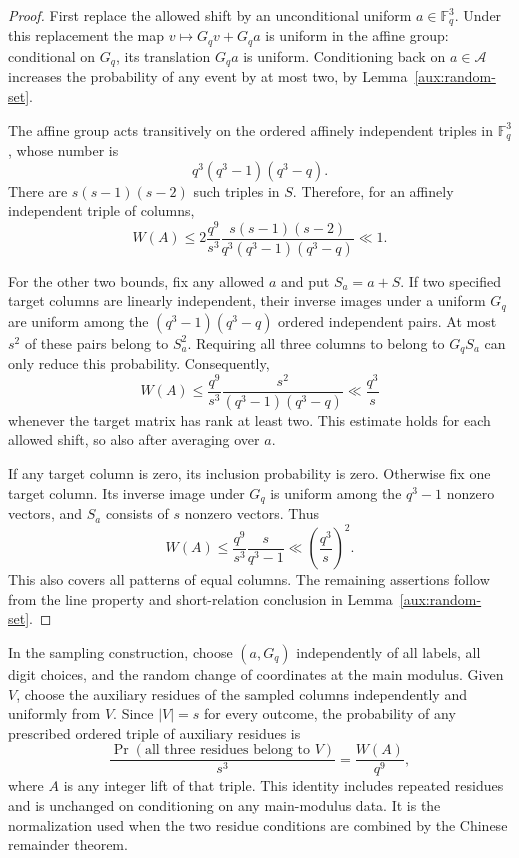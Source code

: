 \begin{proof}
First replace the allowed shift by an unconditional uniform
$a\in\mathbb F_q^3$.  Under this replacement the map
$v\mapsto G_qv+G_qa$ is uniform in the affine group: conditional on
$G_q$, its translation $G_qa$ is uniform.  Conditioning back on
$a\in\mathcal A$ increases the probability of any event by at most
two, by Lemma~\ref{aux:random-set}.

The affine group acts transitively on the ordered affinely independent
triples in $\mathbb F_q^3$, whose number is
\[
 q^3(q^3-1)(q^3-q).
\]
There are $s(s-1)(s-2)$ such triples in $S$.  Therefore, for an
affinely independent triple of columns,
\[
 W(A)\le
 2\frac{q^9}{s^3}
 \frac{s(s-1)(s-2)}{q^3(q^3-1)(q^3-q)}\ll1.
\]

For the other two bounds, fix any allowed $a$ and put $S_a=a+S$.
If two specified target columns are linearly independent, their
inverse images under a uniform $G_q$ are uniform among the
$(q^3-1)(q^3-q)$ ordered independent pairs.  At most $s^2$ of these
pairs belong to $S_a^2$.  Requiring all three columns to belong to
$G_qS_a$ can only reduce this probability.  Consequently,
\[
 W(A)\le\frac{q^9}{s^3}\frac{s^2}{(q^3-1)(q^3-q)}
 \ll\frac{q^3}{s}
\]
whenever the target matrix has rank at least two.  This estimate
holds for each allowed shift, so also after averaging over $a$.

If any target column is zero, its inclusion probability is zero.
Otherwise fix one target column.  Its inverse image under $G_q$ is
uniform among the $q^3-1$ nonzero vectors, and $S_a$ consists of $s$
nonzero vectors.  Thus
\[
 W(A)\le\frac{q^9}{s^3}\frac{s}{q^3-1}
 \ll\left(\frac{q^3}{s}\right)^2.
\]
This also covers all patterns of equal columns.  The remaining
assertions follow from the line property and short-relation
conclusion in Lemma~\ref{aux:random-set}.
\end{proof}

In the sampling construction, choose $(a,G_q)$ independently of all
labels, all digit choices, and the random change of coordinates at the main modulus.
Given $V$, choose the auxiliary residues of the sampled columns
independently and uniformly from $V$.  Since $|V|=s$ for every
outcome, the probability of any prescribed ordered triple of
auxiliary residues is
\begin{equation}\label{aux:normalized-probability}
 \frac{\Pr(\text{all three residues belong to }V)}{s^3}
 =\frac{W(A)}{q^9},
\end{equation}
where $A$ is any integer lift of that triple.  This identity includes
repeated residues and is unchanged on conditioning on any main-modulus
data.  It is the normalization used when the two residue conditions
are combined by the Chinese remainder theorem.
